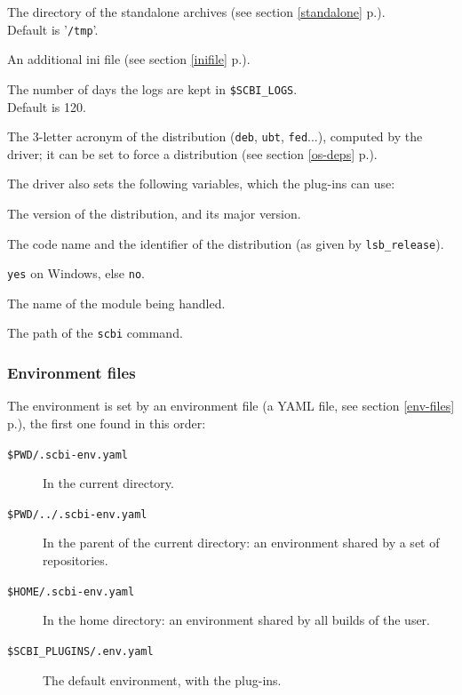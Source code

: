 \documentclass[a4paper,12pt,twoside]{article}
\let\olditem=\item
\def\myitem[#1]{\vspace{10pt}\olditem[#1]}
\newcommand{\code}[1]{\texttt{#1}}
\newcommand{\seeref}[1]{see section \ref{#1} p.\pageref{#1}}
\newcommand{\file}[1]{'{\texttt{#1}}'}
\begin{document}
\begin{description}[before=\let\item\myitem]
	\item[SCBI\_TMP] The directory of the standalone archives (\seeref{standalone}). \\Default is \file{/tmp}.

	\item[SCBI\_INI\_FILE] An additional ini file (\seeref{inifile}).

	\item[KEEP\_LOG\_DAYS] The number of days the logs are kept in \code{\$SCBI\_LOGS}. \\Default is 120.

	\item[SCBI\_OS\_NAME] The 3-letter acronym of the distribution (\code{deb}, \code{ubt}, \code{fed}...), computed by the driver; it can be set to force a distribution (\seeref{os-deps}).
\end{description}

The driver also sets the following variables, which the plug-ins can use:

\begin{description}[before=\let\item\myitem]
	\item[SCBI\_OS\_VERSION, SCBI\_OS\_MAJOR\_VERSION] The version of the distribution, and its major version.

	\item[SCBI\_OS\_CODENAME, SCBI\_OS\_ID] The code name and the identifier of the distribution (as given by \code{lsb\_release}).

	\item[SCBI\_IS\_WINDOWS] \code{yes} on Windows, else \code{no}.

	\item[SCBI\_CURRENT\_MODULE] The name of the module being handled.

	\item[SCBI\_BINARY] The path of the \code{scbi} command.
\end{description}

\subsubsection{Environment files}
\label{envfile}

The environment is set by an environment file (a YAML file,
\seeref{env-files}), the first one found in this order:

\begin{description}
	\item[\code{\$PWD/.scbi-env.yaml}] In the current directory.

	\item[\code{\$PWD/../.scbi-env.yaml}] In the parent of the current directory: an environment shared by a set of repositories.

	\item[\code{\$HOME/.scbi-env.yaml}] In the home directory: an environment shared by all builds of the user.

	\item[\code{\$SCBI\_PLUGINS/.env.yaml}] The default environment, with the plug-ins.
\end{description}
\end{document}
